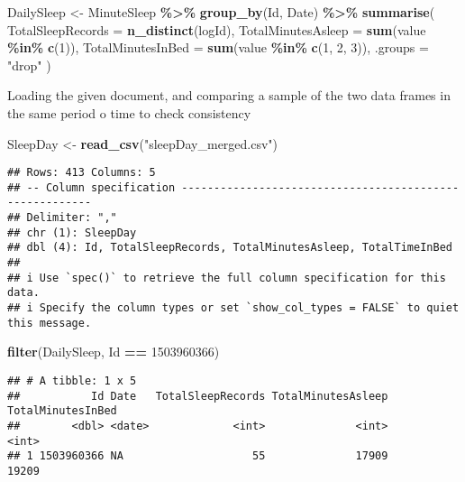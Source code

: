 \documentclass[
]{article}
\newenvironment{Shaded}{\begin{snugshade}}{\end{snugshade}}
\newcommand{\AttributeTok}[1]{\textcolor[rgb]{0.13,0.29,0.53}{#1}}
\newcommand{\DecValTok}[1]{\textcolor[rgb]{0.00,0.00,0.81}{#1}}
\newcommand{\FunctionTok}[1]{\textcolor[rgb]{0.13,0.29,0.53}{\textbf{#1}}}
\newcommand{\NormalTok}[1]{#1}
\newcommand{\OtherTok}[1]{\textcolor[rgb]{0.56,0.35,0.01}{#1}}
\newcommand{\SpecialCharTok}[1]{\textcolor[rgb]{0.81,0.36,0.00}{\textbf{#1}}}
\newcommand{\StringTok}[1]{\textcolor[rgb]{0.31,0.60,0.02}{#1}}
\begin{document}
\begin{Shaded}
\begin{Highlighting}[]
\NormalTok{DailySleep }\OtherTok{\textless{}{-}}\NormalTok{ MinuteSleep }\SpecialCharTok{\%\textgreater{}\%}
\FunctionTok{group\_by}\NormalTok{(Id, Date) }\SpecialCharTok{\%\textgreater{}\%}
\FunctionTok{summarise}\NormalTok{(}
  \AttributeTok{TotalSleepRecords =} \FunctionTok{n\_distinct}\NormalTok{(logId),}
  \AttributeTok{TotalMinutesAsleep =} \FunctionTok{sum}\NormalTok{(value }\SpecialCharTok{\%in\%} \FunctionTok{c}\NormalTok{(}\DecValTok{1}\NormalTok{)),}
  \AttributeTok{TotalMinutesInBed =} \FunctionTok{sum}\NormalTok{(value }\SpecialCharTok{\%in\%} \FunctionTok{c}\NormalTok{(}\DecValTok{1}\NormalTok{, }\DecValTok{2}\NormalTok{, }\DecValTok{3}\NormalTok{)),}
  \AttributeTok{.groups =} \StringTok{"drop"}
\NormalTok{  )}
\end{Highlighting}
\end{Shaded}

Loading the given document, and comparing a sample of the two data
frames in the same period o time to check consistency

\begin{Shaded}
\begin{Highlighting}[]
\NormalTok{SleepDay }\OtherTok{\textless{}{-}} \FunctionTok{read\_csv}\NormalTok{(}\StringTok{"sleepDay\_merged.csv"}\NormalTok{)}
\end{Highlighting}
\end{Shaded}

\begin{verbatim}
## Rows: 413 Columns: 5
## -- Column specification --------------------------------------------------------
## Delimiter: ","
## chr (1): SleepDay
## dbl (4): Id, TotalSleepRecords, TotalMinutesAsleep, TotalTimeInBed
## 
## i Use `spec()` to retrieve the full column specification for this data.
## i Specify the column types or set `show_col_types = FALSE` to quiet this message.
\end{verbatim}

\begin{Shaded}
\begin{Highlighting}[]
\FunctionTok{filter}\NormalTok{(DailySleep, Id }\SpecialCharTok{==} \DecValTok{1503960366}\NormalTok{)}
\end{Highlighting}
\end{Shaded}

\begin{verbatim}
## # A tibble: 1 x 5
##           Id Date   TotalSleepRecords TotalMinutesAsleep TotalMinutesInBed
##        <dbl> <date>             <int>              <int>             <int>
## 1 1503960366 NA                    55              17909             19209
\end{verbatim}
\end{document}
